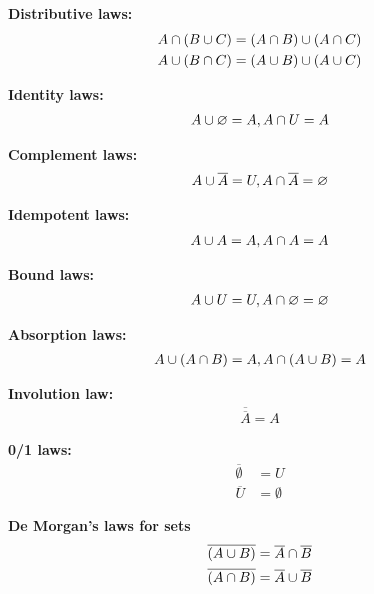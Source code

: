 \clearpage

\textbf{Distributive laws:}
\begin{align*}
    A \cap (B \cup C) &= (A \cap B) \cup (A \cap C)\\
    A \cup (B \cap C) &= (A \cup B) \cup (A \cup C)
\end{align*}

\textbf{Identity laws:}
\begin{align*}
    A \cup \varnothing = A, A \cap U = A
\end{align*}

\textbf{Complement laws:}
\begin{align*}
    A \cup \overline{A} = U, A \cap \overline{A} = \varnothing
\end{align*}

\textbf{Idempotent laws:}
\begin{align*}
    A \cup A = A, A \cap A = A
\end{align*}

\textbf{Bound laws:}
\begin{align*}
    A \cup U = U, A \cap \varnothing = \varnothing
\end{align*}

\textbf{Absorption laws:}
\begin{align*}
    A \cup (A \cap B) = A, A \cap (A \cup B) = A
\end{align*}

\textbf{Involution law:}
\begin{align*}
    \overline{\overline{A}} = A
\end{align*}

\textbf{0/1 laws:}
\begin{align*}
    \overline{\emptyset} &= U\\
    \overline{U} &= \emptyset
\end{align*}

\textbf{De Morgan's laws for sets}
\begin{align*}
    \overline{(A \cup B)} &= \overline{A} \cap \overline{B}\\
    \overline{(A \cap B)} &= \overline{A} \cup \overline{B}
\end{align*}








